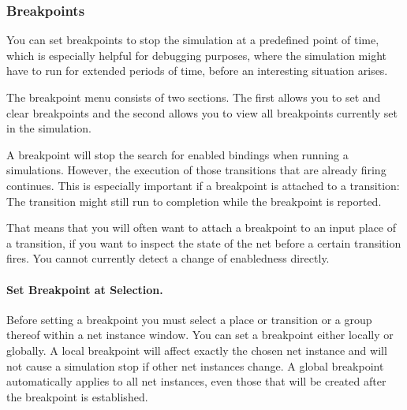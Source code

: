 

\subsubsection{Breakpoints}
\label{subsec:breakpoint}

You can set breakpoints to stop the simulation at a predefined
point of time, which is especially helpful for debugging purposes,
where the simulation might have to run for extended periods
of time, before an interesting situation arises.


The breakpoint menu consists of two sections. The first allows
you to set and clear breakpoints and the second allows you to
view all breakpoints currently set in the simulation.

A breakpoint will stop the search for enabled bindings when running
a simulations. However, the execution of those transitions
that are already firing continues. This is especially important if a
breakpoint is attached to a transition: The transition might still
run to completion while the breakpoint is reported.

That means that you will often want
to attach a breakpoint to an input place of a transition, if you
want to inspect the state of the net before a certain
transition fires. You cannot currently detect a change of enabledness
directly.

\paragraph{Set Breakpoint at Selection.}

Before setting a breakpoint you must select a place or transition
or a group thereof within a net instance window.
You can set a breakpoint either locally or globally.
A local breakpoint will affect exactly the chosen net instance
and will not cause a simulation stop if other net instances
change. A global breakpoint automatically applies to
all net instances, even those that will be created after the breakpoint
is established.


